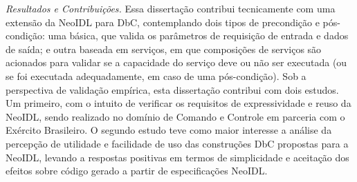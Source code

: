 \emph{Resultados e Contribuições.}
Essa dissertação contribui tecnicamente com uma extensão da NeoIDL para DbC, contemplando
dois tipos de precondição e pós-condição: uma básica, que valida os
parâmetros de requisição de entrada e dados de saída; e outra baseada em serviços,
em que composições de serviços são acionados para validar se a
capacidade do serviço deve ou não ser executada (ou se foi executada adequadamente, em caso de
uma pós-condição). %
Sob a perspectiva de validação empírica, esta dissertação contribui com dois estudos.
Um primeiro, com o intuito de verificar
os requisitos de expressividade e reuso da NeoIDL, sendo realizado no
domínio de Comando e Controle em parceria com o Exército Brasileiro. O segundo
estudo teve como maior interesse a análise da percepção de utilidade e
facilidade de uso das construções DbC propostas para a NeoIDL,
levando a respostas positivas em termos de simplicidade e aceitação dos efeitos
sobre código gerado a partir de especificações NeoIDL.
%
%

  
\clearpage



